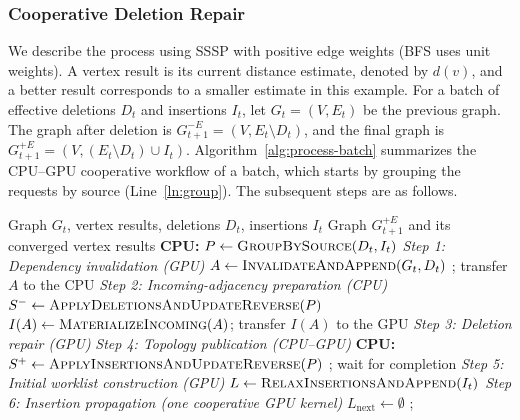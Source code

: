 \subsubsection{Cooperative Deletion Repair}
\label{sec:deletion-repair}
We describe the process using SSSP with positive edge weights (BFS uses unit weights). A vertex result is its current distance estimate, denoted by $d(v)$, and a better result corresponds to a smaller estimate in this example. For a batch of effective deletions $D_t$ and insertions $I_t$, let $G_t=(V,E_t)$ be the previous graph. The graph after deletion is $G_{t+1}^{-E}=(V,E_t\setminus D_t)$, and the final graph is $G_{t+1}^{+E}=(V,(E_t\setminus D_t)\cup I_t)$. Algorithm~\ref{alg:process-batch} summarizes the CPU--GPU cooperative workflow of a batch, which starts by grouping the requests by source (Line~\ref{ln:group}). The subsequent steps are as follows.

\begin{algorithm}[t]
\caption{CPU--GPU cooperative processing of an update batch.}
\label{alg:process-batch}
\small
\begin{algorithmic}[1]
\Require Graph $G_t$, vertex results, deletions $D_t$, insertions $I_t$
\Ensure Graph $G_{t+1}^{+E}$ and its converged vertex results
\State \textbf{CPU:} $P \gets \Call{GroupBySource}{D_t,I_t}$ \label{ln:group}
\Statex \textit{Step 1: Dependency invalidation (GPU)}
\State $A \gets \Call{InvalidateAndAppend}{G_t,D_t}$  \label{ln:inv}
\State {}; transfer $A$ to the CPU \label{ln:reset}
\Statex \textit{Step 2: Incoming-adjacency preparation (CPU)}
\State $S^- \gets \Call{ApplyDeletionsAndUpdateReverse}{P}$ \label{ln:applydel}
\State $I(A) \gets \Call{MaterializeIncoming}{A}$; transfer $I(A)$ to the GPU \label{ln:incoming}
\Statex \textit{Step 3: Deletion repair (GPU)}
\Repeat \label{ln:repair-begin}
        \State {} 
    \EndFor
{}  \label{ln:repair-end}
\Statex \textit{Step 4: Topology publication (CPU--GPU)}
\State \textbf{CPU:} $S^+ \gets \Call{ApplyInsertionsAndUpdateReverse}{P}$ \label{ln:applyins}
\State {}; wait for completion \label{ln:publish}
\Statex \textit{Step 5: Initial worklist construction (GPU)}
\State $L \gets \Call{RelaxInsertionsAndAppend}{I_t}$ \label{ln:seed}
\Statex \textit{Step 6: Insertion propagation (one cooperative GPU kernel)}
 \label{ln:prop-begin}
    \State $L_{\mathrm{next}} \gets \emptyset$
         \label{ln:commit}
                 \label{ln:relax}
                    \State {} \label{ln:append}
                \EndIf
            \EndFor
        \EndIf
    \EndFor
    \State {};  \label{ln:prop-end}
\EndWhile
\end{algorithmic}
\end{algorithm}

